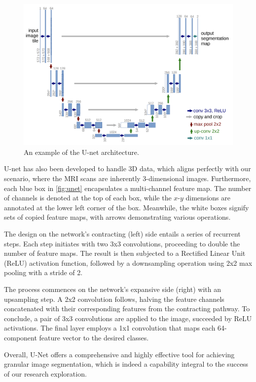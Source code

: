 \begin{figure}[htp]
    \centering
    \includegraphics[width=\textwidth]{./figures/unet.png}
    \caption{An example of the U-net architecture.}
    \label{fig:unet}
\end{figure}

U-net has also been developed to handle 3D data, which aligns perfectly with our scenario, where the MRI scans are inherently 3-dimensional images. Furthermore, each blue box in \autoref{fig:unet} encapsulates a multi-channel feature map. The number of channels is denoted at the top of each box, while the \(x\)-\(y\) dimensions are annotated at the lower left corner of the box. Meanwhile, the white boxes signify sets of copied feature maps, with arrows demonstrating various operations.

The design on the network's contracting (left) side entails a series of recurrent steps. Each step initiates with two 3x3 convolutions, proceeding to double the number of feature maps. The result is then subjected to a Rectified Linear Unit (ReLU) activation function, followed by a downsampling operation using 2x2 max pooling with a stride of 2.

The process commences on the network's expansive side (right) with an upsampling step. A 2x2 convolution follows, halving the feature channels concatenated with their corresponding features from the contracting pathway. To conclude, a pair of 3x3 convolutions are applied to the image, succeeded by ReLU activations. The final layer employs a 1x1 convolution that maps each 64-component feature vector to the desired classes.

Overall, U-Net offers a comprehensive and highly effective tool for achieving granular image segmentation, which is indeed a capability integral to the success of our research exploration.

